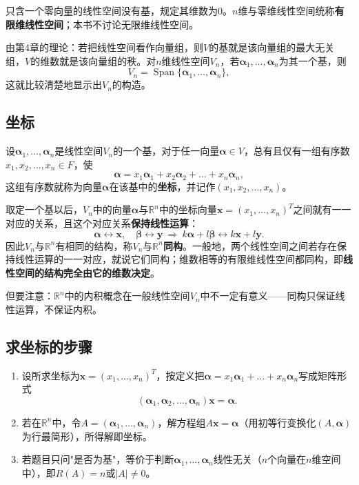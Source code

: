 只含一个零向量的线性空间没有基，规定其维数为$0$。$n$维与零维线性空间统称\textbf{有限维线性空间}；本书不讨论无限维线性空间。

由第4章的理论：若把线性空间看作向量组，则$V$的基就是该向量组的最大无关组，$V$的维数就是该向量组的秩。对$n$维线性空间$V_n$，若$\boldsymbol{\alpha}_1,\dots,\boldsymbol{\alpha}_n$为其一个基，则
\[
V_n=\operatorname{Span}\{\boldsymbol{\alpha}_1,\dots,\boldsymbol{\alpha}_n\},
\]
这就比较清楚地显示出$V_n$的构造。

\subsection{坐标}
\begin{definition}[坐标]
设$\boldsymbol{\alpha}_1,\dots,\boldsymbol{\alpha}_n$是线性空间$V_n$的一个基，对于任一向量$\boldsymbol{\alpha}\in V$，总有且仅有一组有序数$x_1,x_2,\dots,x_n\in F$，使
\[
\boldsymbol{\alpha}=x_1\boldsymbol{\alpha}_1+x_2\boldsymbol{\alpha}_2+\dots+x_n\boldsymbol{\alpha}_n,
\]
这组有序数就称为向量$\boldsymbol{\alpha}$在该基中的\textbf{坐标}，并记作$(x_1,x_2,\dots,x_n)$。
\end{definition}

取定一个基以后，$V_n$中的向量$\boldsymbol{\alpha}$与$\mathbb{R}^{n}$中的坐标向量$\boldsymbol{x}=(x_1,\dots,x_n)^{T}$之间就有一一对应的关系，且这个对应关系\textbf{保持线性运算}：
\[
\boldsymbol{\alpha}\leftrightarrow\boldsymbol{x},\quad \boldsymbol{\beta}\leftrightarrow\boldsymbol{y}
\ \Longrightarrow\ 
k\boldsymbol{\alpha}+l\boldsymbol{\beta}\leftrightarrow k\boldsymbol{x}+l\boldsymbol{y}.
\]
因此$V_n$与$\mathbb{R}^{n}$有相同的结构，称$V_n$与$\mathbb{R}^{n}$\textbf{同构}。一般地，两个线性空间之间若存在保持线性运算的一一对应，就说它们同构；维数相等的有限维线性空间都同构，即\textbf{线性空间的结构完全由它的维数决定}。

但要注意：$\mathbb{R}^{n}$中的内积概念在一般线性空间$V_n$中不一定有意义——同构只保证线性运算，不保证内积。

\subsection{求坐标的步骤}
\begin{enumerate}
    \item 设所求坐标为$\boldsymbol{x}=(x_1,\dots,x_n)^{T}$，按定义把$\boldsymbol{\alpha}=x_1\boldsymbol{\alpha}_1+\dots+x_n\boldsymbol{\alpha}_n$写成矩阵形式
    \[
    (\boldsymbol{\alpha}_1,\boldsymbol{\alpha}_2,\dots,\boldsymbol{\alpha}_n)\boldsymbol{x}=\boldsymbol{\alpha}.
    \]
    \item 若在$\mathbb{R}^{n}$中，令$A=(\boldsymbol{\alpha}_1,\dots,\boldsymbol{\alpha}_n)$，解方程组$A\boldsymbol{x}=\boldsymbol{\alpha}$（用初等行变换化$(A,\boldsymbol{\alpha})$为行最简形），所得解即坐标。
    \item 若题目只问"是否为基"，等价于判断$\boldsymbol{\alpha}_1,\dots,\boldsymbol{\alpha}_n$线性无关（$n$个向量在$n$维空间中），即$R(A)=n$或$|A|\ne0$。
\end{enumerate}

